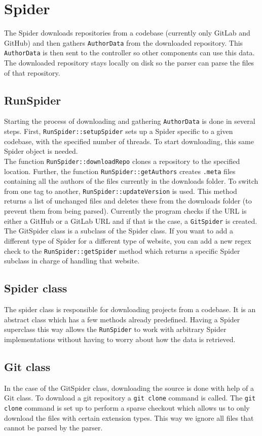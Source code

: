 \documentclass[../Main.tex]{subfiles}
\begin{document}
\section{Spider}
The Spider downloads repositories from a codebase (currently only GitLab and GitHub) and then gathers \texttt{AuthorData} from the downloaded repository. This \texttt{AuthorData} is then sent to the controller so other components can use this data. The downloaded repository stays locally on disk so the parser can parse the files of that repository.
\subsection{RunSpider}
Starting the process of downloading and gathering \texttt{AuthorData} is done in several steps. First, \texttt{RunSpider::setupSpider} sets up a Spider specific to a given codebase, with the specified number of threads. To start downloading, this same Spider object is needed.\\

The function \texttt{RunSpider::downloadRepo} clones a repository to the specified location. Further, the function \texttt{RunSpider::getAuthors} creates \texttt{.meta} files containing all the authors of the files currently in the downloads folder. To switch from one tag to another, \texttt{RunSpider::updateVersion} is used. This method returns a list of unchanged files and deletes these from the downloads folder (to prevent them from being parsed). Currently the program checks if the URL is either a GitHub or a GitLab URL and if that is the case, a \texttt{GitSpider} is created. The GitSpider class is a subclass of the Spider class. If you want to add a different type of Spider for a different type of website, you can add a new regex check to the \texttt{RunSpider::getSpider} method which returns a specific Spider subclass in charge of handling that website.
\subsection{Spider class}
The spider class is responsible for downloading projects from a codebase. It is an abstract class which has a few methods already predefined. Having a Spider superclass this way allows the \texttt{RunSpider} to work with arbitrary Spider implementations without having to worry about how the data is retrieved. 
\subsection{Git class}
In the case of the GitSpider class, downloading the source is done with help of a Git class. To download a git repository a \texttt{git clone} command is called. The \texttt{git clone} command is set up to perform a sparse checkout which allows us to only download the files with certain extension types. This way we ignore all files that cannot be parsed by the parser.
\end{document}
